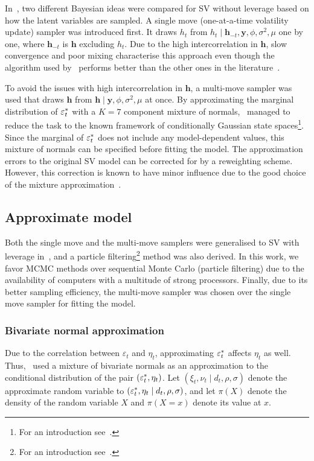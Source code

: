 In~\citet{Kim1998}, two different Bayesian ideas were compared for SV without leverage based on how the latent variables are sampled.
A single move (one-at-a-time volatility update) sampler was introduced first. It draws $h_t$ from $h_t\mid\bm{h}_{-t},\bm{y},\phi,\sigma^2,\mu$ one by one, where $\bm{h}_{-t}$ is $\bm{h}$ excluding $h_t$.
Due to the high intercorrelation in $\bm{h}$, slow convergence and poor mixing characterise this approach even though the algorithm used by~\citet{Kim1998} performs better than the other ones in the literature~\citep{shephard1993fitting,jacquier2002bayesian,shephard1994comment,shephard1997likelihood,geweke1994bayesian}.

To avoid the issues with high intercorrelation in $\bm{h}$, a multi-move sampler was used that draws $\bm{h}$ from $\bm{h}\mid\bm{y},\phi,\sigma^2,\mu$ at once.
By approximating the marginal distribution of $\varepsilon_t^\ast$ with a $K=7$ component mixture of normals,~\citet{Kim1998} managed to reduce the task to the known framework of conditionally Gaussian state spaces\footnote{For an introduction see~\citet{Kitagawa1996}.}.
Since the marginal of $\varepsilon_t^\ast$ does not include any model-dependent values, this mixture of normals can be specified before fitting the model.
The approximation errors to the original SV model can be corrected for by a reweighting scheme.
However, this correction is known to have minor influence due to the good choice of the mixture approximation~\citep{Kim1998}.

\subsection{Approximate model}

Both the single move and the multi-move samplers were generalised to SV with leverage in~\citet{Omori2007}, and a particle filtering\footnote{For an introduction see~\citet{Johannes2009}.} method was also derived.
In this work, we favor MCMC methods over sequential Monte Carlo (particle filtering) due to the availability of computers with a multitude of strong processors.
Finally, due to its better sampling efficiency, the multi-move sampler was chosen over the single move sampler for fitting the model.

\subsubsection{Bivariate normal approximation}

Due to the correlation between $\varepsilon_t$ and $\eta_t$, approximating $\varepsilon_t^\ast$ affects $\eta_t$ as well.
Thus,~\citet{Omori2007} used a mixture of bivariate normals as an approximation to the conditional distribution of the pair $(\varepsilon_t^\ast, \eta_t)$.
Let $(\xi_t,\nu_t\mid d_t,\rho,\sigma)$ denote the approximate random variable to $(\varepsilon_t^\ast,\eta_t\mid d_t,\rho,\sigma)$, and let $\pi(X)$ denote the density of the random variable $X$ and $\pi(X=x)$ denote its value at $x$.

